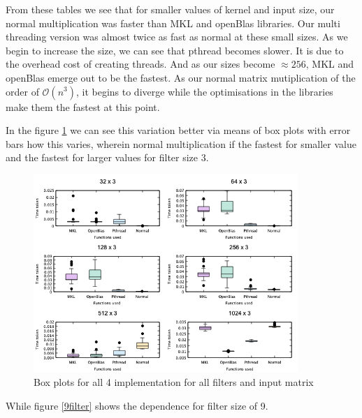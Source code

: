 \documentclass[a4paper]{article}
\begin{document}
From these tables we see that for smaller values of kernel and input size, our normal multiplication was faster than MKL and openBlas libraries. Our multi threading version was almost twice as fast as normal at these small sizes. As we begin to increase the size, we can see that pthread becomes slower. It is due to the overhead cost of creating threads. And as our sizes become $\approx 256$, MKL and openBlas emerge out to be the fastest. As our normal matrix mutiplication of the order of $\mathcal{O}(n^3)$, it begins to diverge while the optimisations in the libraries make them the fastest at this point.

In the figure \ref{3filter} we can see this variation better via means of box plots with error bars how this varies, wherein normal multiplication if the fastest for smaller value and the fastest for larger values for filter size 3.

\begin{figure}[!htbp]
\begin{center}
\includegraphics[width=10cm]{3filter.png}
\end{center}
\caption{Box plots for all 4 implementation for all filters and input matrix} \label{3filter}
\end{figure}


While figure \ref{9filter} shows the dependence for filter size of 9.
\end{document}

